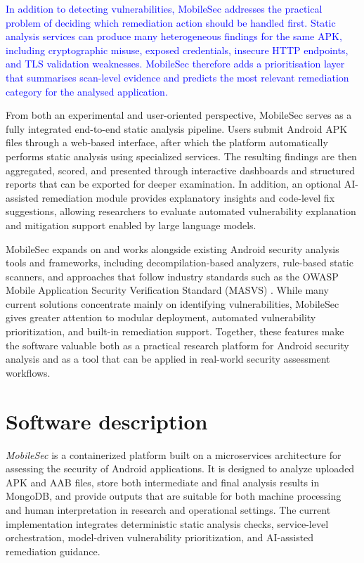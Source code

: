\documentclass[preprint,12pt, a4paper]{elsarticle}
\begin{document}
\textcolor{blue}{In addition to detecting vulnerabilities, MobileSec addresses the practical
problem of deciding which remediation action should be handled first. Static
analysis services can produce many heterogeneous findings for the same APK,
including cryptographic misuse, exposed credentials, insecure HTTP endpoints,
and TLS validation weaknesses. MobileSec therefore adds a prioritisation layer
that summarises scan-level evidence and predicts the most relevant remediation
category for the analysed application.}

From both an experimental and user-oriented perspective, MobileSec serves as a fully integrated end-to-end static analysis pipeline. Users submit Android APK files through a web-based interface, after which the platform automatically performs static analysis using specialized services. The resulting findings are then aggregated, scored, and presented through interactive dashboards and structured reports that can be exported for deeper examination. In addition, an optional AI-assisted remediation module provides explanatory insights and code-level fix suggestions, allowing researchers to evaluate automated vulnerability explanation and mitigation support enabled by large language models. \cite{pearce2022copilot,white2023prompt}

MobileSec expands on and works alongside existing Android security analysis tools and frameworks, including decompilation-based analyzers, rule-based static scanners, and approaches that follow industry standards such as the OWASP Mobile Application Security Verification Standard (MASVS) \cite{owaspmasvs}. While many current solutions concentrate mainly on identifying vulnerabilities, MobileSec gives greater attention to modular deployment, automated vulnerability prioritization, and built-in remediation support. Together, these features make the software valuable both as a practical research platform for Android security analysis and as a tool that can be applied in real-world security assessment workflows.

\section{Software description}

\textit{MobileSec} is a containerized platform built on a microservices architecture for assessing the security of Android applications. It is designed to analyze uploaded APK and AAB files, store both intermediate and final analysis results in MongoDB, and provide outputs that are suitable for both machine processing and human interpretation in research and operational settings. The current implementation integrates deterministic static analysis checks, service-level orchestration, model-driven vulnerability prioritization, and AI-assisted remediation guidance.
\end{document}
